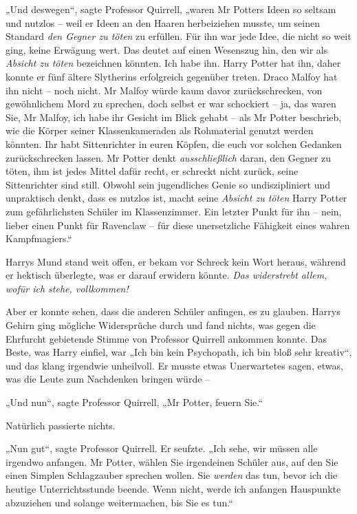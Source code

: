{„Und deswegen“, sagte Professor Quirrell, „waren Mr Potters Ideen so seltsam und nutzlos -- weil er Ideen an den Haaren herbeiziehen musste, um seinen Standard \emph{den Gegner zu töten} zu erfüllen. Für ihn war jede Idee, die nicht so weit ging, keine Erwägung wert. Das deutet auf einen Wesenszug hin, den wir als \emph{Absicht zu töten} bezeichnen könnten. Ich habe ihn. Harry Potter hat ihn, daher konnte er fünf ältere Slytherins erfolgreich gegenüber treten. Draco Malfoy hat ihn nicht -- noch nicht. Mr Malfoy würde kaum davor zurückschrecken, von gewöhnlichem Mord zu sprechen, doch selbst er war schockiert -- ja, das waren Sie, Mr Malfoy, ich habe ihr Gesicht im Blick gehabt -- als Mr Potter beschrieb, wie die Körper seiner Klassenkameraden als Rohmaterial genutzt werden könnten. Ihr habt Sittenrichter in euren Köpfen, die euch vor solchen Gedanken zurückschrecken lassen. Mr Potter denkt \emph{ausschließlich} daran, den Gegner zu töten, ihm ist jedes Mittel dafür recht, er schreckt nicht zurück, seine Sittenrichter sind still. Obwohl sein jugendliches Genie so undiszipliniert und unpraktisch denkt, dass es nutzlos ist, macht seine \emph{Absicht zu töten} Harry Potter zum gefährlichsten Schüler im Klassenzimmer. Ein letzter Punkt für ihn -- nein, lieber einen Punkt für Ravenclaw -- für diese unersetzliche Fähigkeit eines wahren Kampfmagiers.“

Harrys Mund stand weit offen, er bekam vor Schreck kein Wort heraus, während er hektisch überlegte, was er darauf erwidern könnte. \emph{Das widerstrebt allem, wofür ich stehe, vollkommen!}

Aber er konnte sehen, dass die anderen Schüler anfingen, es zu glauben. Harrys Gehirn ging mögliche Widersprüche durch und fand nichts, was gegen die Ehrfurcht gebietende Stimme von Professor Quirrell ankommen konnte. Das Beste, was Harry einfiel, war „Ich bin kein Psychopath, ich bin bloß sehr kreativ“, und das klang irgendwie unheilvoll. Er musste etwas Unerwartetes sagen, etwas, was die Leute zum Nachdenken bringen würde --

„Und nun“, sagte Professor Quirrell, „Mr Potter, feuern Sie.“

Natürlich passierte nichts.

„Nun gut“, sagte Professor Quirrell. Er seufzte. „Ich sehe, wir müssen alle irgendwo anfangen. Mr Potter, wählen Sie irgendeinen Schüler aus, auf den Sie einen Simplen Schlagzauber sprechen wollen. Sie \emph{werden} das tun, bevor ich die heutige Unterrichtsstunde beende. Wenn nicht, werde ich anfangen Hauspunkte abzuziehen und solange weitermachen, bis Sie es tun.“

}
